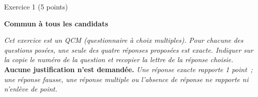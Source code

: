 
%
\begin{h2}Exercice 1 (5 points)\end{h2}
\par
\textbf{Commun  à tous les candidats}
\bigbreak
\par
\emph{Cet exercice est un QCM (questionnaire à choix multiples). Pour chacune des questions
     posées, une seule des quatre réponses proposées est exacte. Indiquer sur la copie le
numéro de la question et recopier la lettre de la réponse choisie.}
\medbreak
\textbf{Aucune justification n'est demandée.}
\medbreak
\emph{Une réponse exacte rapporte 1 point~; une réponse fausse, une réponse multiple ou l'absence de réponse ne rapporte ni n'enlève de point.}
\medbreak
